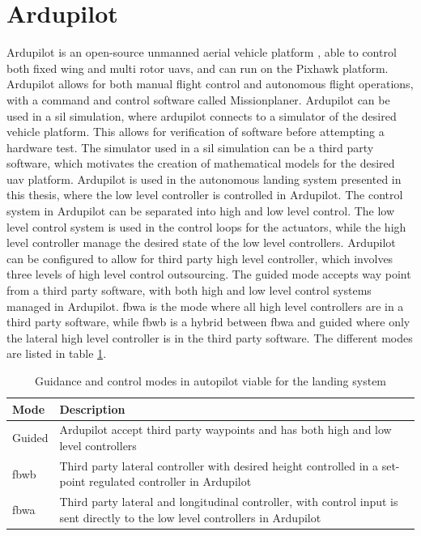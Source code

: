 \section{Ardupilot}\label{ss:ardupilot}
Ardupilot is an open-source unmanned aerial vehicle platform \citep{ArduPilot}, able to control both fixed wing and multi rotor \glspl{uav}, and can run on the Pixhawk platform. Ardupilot allows for both manual flight control and autonomous flight operations, with a command and control software called Missionplaner. Ardupilot can be used in a \gls{sil} simulation, where ardupilot connects to a simulator of the desired vehicle platform. This allows for verification of software before attempting a hardware test. The simulator used in a \gls{sil} simulation can be a third party software, which motivates the creation of mathematical models for the desired \gls{uav} platform. Ardupilot is used in the autonomous landing system presented in this thesis, where the low level controller is controlled in Ardupilot. The control system in Ardupilot can be separated into high and low level control. The low level control system is used in the control loops for the actuators, while the high level controller manage the desired state of the low level controllers. Ardupilot can be configured to allow for third party high level controller, which involves three levels of high level control outsourcing. The guided mode accepts way point from a third party software, with both high and low level control systems managed in Ardupilot. \gls{fbwa} is the mode where all high level controllers are in a third party software, while \gls{fbwb} is a hybrid between \gls{fbwa} and guided where only the lateral high level controller is in the third party software. The different modes are listed in table \ref{tb:ArduPilotMode}.
\newpage
\begin{table}[H]
\centering
\begin{tabular}{| p{3cm} | p{5cm}|}
\hline
\textbf{Mode}	&	\textbf{Description} \\ \hline
Guided			& Ardupilot accept third party waypoints and has both high and low level controllers										\\ \hline
\gls{fbwb}			& Third party lateral controller with desired height controlled in a set-point regulated controller in Ardupilot \\ \hline
\gls{fbwa}			& Third party lateral and longitudinal controller, with control input is sent directly to the low level controllers in Ardupilot 	\\ \hline
\end{tabular}
\caption{Guidance and control modes in autopilot viable for the landing system}
\label{tb:ArduPilotMode}
\end{table}

